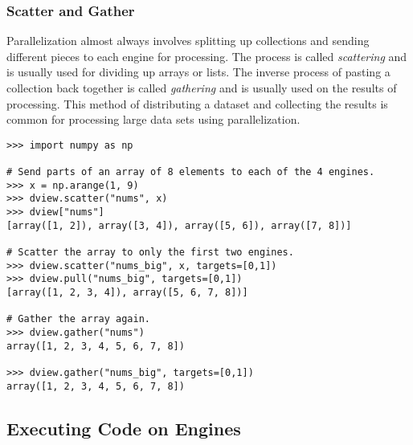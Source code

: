 %

\subsubsection*{Scatter and Gather} %

Parallelization almost always involves splitting up collections and sending different pieces to each engine for processing.
The process is called \emph{scattering} and is usually used for dividing up arrays or lists.
The inverse process of pasting a collection back together is called \emph{gathering} and is usually used on the results of processing.
This method of distributing a dataset and collecting the results is common for processing large data sets using parallelization.

\begin{lstlisting}
>>> import numpy as np

# Send parts of an array of 8 elements to each of the 4 engines.
>>> x = np.arange(1, 9)
>>> dview.scatter("nums", x)
>>> dview["nums"]
[array([1, 2]), array([3, 4]), array([5, 6]), array([7, 8])]

# Scatter the array to only the first two engines.
>>> dview.scatter("nums_big", x, targets=[0,1])
>>> dview.pull("nums_big", targets=[0,1])
[array([1, 2, 3, 4]), array([5, 6, 7, 8])]

# Gather the array again.
>>> dview.gather("nums")
array([1, 2, 3, 4, 5, 6, 7, 8])

>>> dview.gather("nums_big", targets=[0,1])
array([1, 2, 3, 4, 5, 6, 7, 8])
\end{lstlisting}

\subsection*{Executing Code on Engines} %

